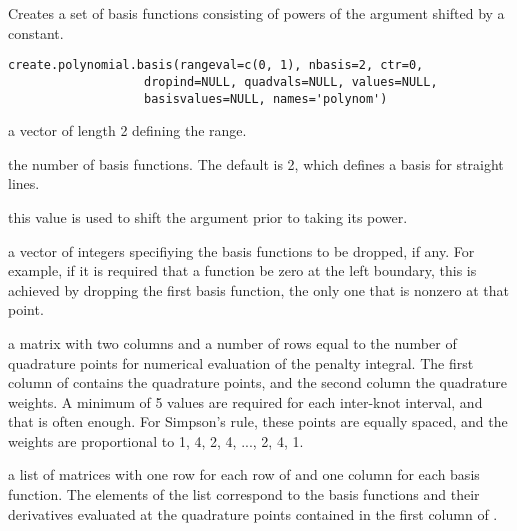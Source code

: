 \documentclass{article}
\begin{document}
\begin{Description}\relax
Creates a set of basis functions consisting of powers
of the argument shifted by a constant.
\end{Description}
\begin{Usage}
\begin{verbatim}
create.polynomial.basis(rangeval=c(0, 1), nbasis=2, ctr=0,
                   dropind=NULL, quadvals=NULL, values=NULL,
                   basisvalues=NULL, names='polynom')
\end{verbatim}
\end{Usage}
\begin{Arguments}
\begin{ldescription}
\item[\code{rangeval}] a vector of length 2 defining the range.

\item[\code{nbasis}] the number of basis functions. The default is 2,
which defines a basis for straight lines.

\item[\code{ctr}] this value is used to shift the argument prior to taking
its power.

\item[\code{dropind}] a vector of integers specifiying the basis functions to
be dropped, if any.  For example, if it is required that
a function be zero at the left boundary, this is achieved
by dropping the first basis function, the only one that
is nonzero at that point.

\item[\code{quadvals}] a matrix with two columns and a number of rows equal to the number
of quadrature points for numerical evaluation of the penalty
integral.  The first column of  contains the
quadrature points, and the second column the quadrature weights.  A
minimum of 5 values are required for each inter-knot interval, and
that is often enough.  For Simpson's rule, these points are equally
spaced, and the weights are proportional to 1, 4, 2, 4, ..., 2, 4,
1.

\item[\code{values}] a list of matrices with one row for each row of  and
one column for each basis function.  The elements of the list
correspond to the basis functions and their derivatives evaluated at
the quadrature points contained in the first column of
.


\end{ldescription}
\end{Arguments}
\end{document}
